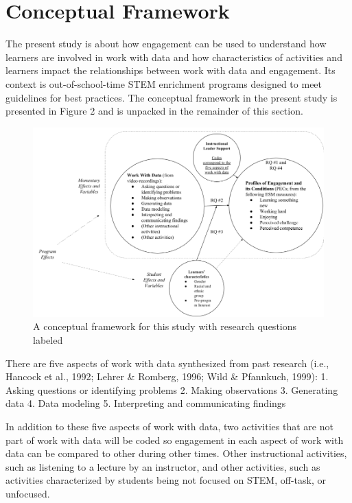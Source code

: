 \documentclass[]{msu-thesis}
\theoremstyle{definition}
\theoremstyle{definition}
\theoremstyle{definition}
\theoremstyle{remark}
\begin{document}
\section{Conceptual Framework}\label{conceptual-framework}

The present study is about how engagement can be used to understand how
learners are involved in work with data and how characteristics of
activities and learners impact the relationships between work with data
and engagement. Its context is out-of-school-time STEM enrichment
programs designed to meet guidelines for best practices. The conceptual
framework in the present study is presented in Figure 2 and is unpacked
in the remainder of this section.

\begin{figure}

{\centering \includegraphics[width=0.8\linewidth]{images/figure2} 

}

\caption{A conceptual framework for this study with research questions labeled}\label{fig:unnamed-chunk-2}
\end{figure}

There are five aspects of work with data synthesized from past research
(i.e., Hancock et al., 1992; Lehrer \& Romberg, 1996; Wild \& Pfannkuch,
1999): 1. Asking questions or identifying problems 2. Making
observations 3. Generating data 4. Data modeling 5. Interpreting and
communicating findings

In addition to these five aspects of work with data, two activities that
are not part of work with data will be coded so engagement in each
aspect of work with data can be compared to other during other times.
Other instructional activities, such as listening to a lecture by an
instructor, and other activities, such as activities characterized by
students being not focused on STEM, off-task, or unfocused.
\end{document}
